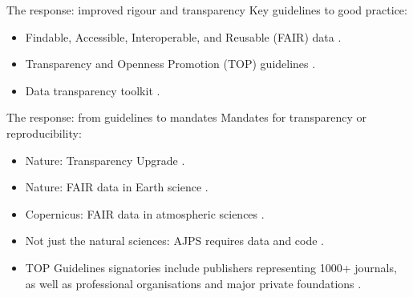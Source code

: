 \documentclass[aspectratio=169, 12pt]{beamer} %
\begin{document}
\begin{frame}{The response: improved rigour and transparency}
  Key guidelines to good practice:
    \begin{itemize}[label=\textbullet]
        \item Findable, Accessible, Interoperable, and Reusable (FAIR) data \cite{Wilkinson2016-mr, Go-fair2017-vs}.
        \item Transparency and Openness Promotion (TOP) guidelines \cite{Nosek2015-wm, Cos2019-mr}.
        \item Data transparency toolkit \cite{Perkel2018-rw}.
    \end{itemize}
\end{frame}

\begin{frame}{The response: from guidelines to mandates}
  Mandates for transparency or reproducibility:
    \begin{itemize}[label=\textbullet]
        \item Nature: Transparency Upgrade \cite{Nature2017-lq}.
        \item Nature: FAIR data in Earth science \cite{Nature2019-ng}.
        \item Copernicus: FAIR data in atmospheric sciences \cite{Van_Edig2018-bu}.
        \item Not just the natural sciences: AJPS requires data and code \cite{Jacoby2017-lw, Ajps2015-ex}.
        \item TOP Guidelines signatories include publishers representing 1000+ journals, as well as professional organisations and major private foundations  \cite{Cos2019-mr}.
    \end{itemize}
\end{frame}

\end{document}
